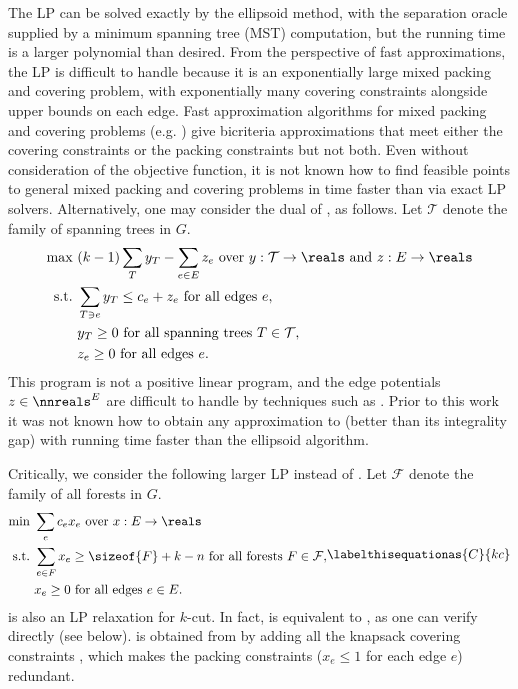 \documentclass{toc}
\newcommand{\costof}[1]{c_{#1}}
\newcommand{\capacityof}{\costof}%
\providecommand{\trees}{\mathcal{T}} %
\newcommand{\forests}{\mathcal{F}} %
\begin{document}
The LP  can be solved exactly by the ellipsoid method,
with the separation oracle supplied by a minimum spanning tree
%
(MST)   %
computation, but the running time is a larger polynomial than
desired. From the perspective of fast approximations, the LP
 is difficult to handle because it is an exponentially
large mixed packing and covering problem, with exponentially many
covering constraints alongside upper bounds on each edge. Fast
approximation algorithms for mixed packing and covering problems (e.g.
\cite{cq-18-soda,young-14}) give bicriteria approximations that
meet either the covering constraints or the packing constraints but
not both.  Even without consideration of the objective function, it is
not known how to find feasible points to general mixed packing and
covering problems in time faster than via exact LP
solvers. Alternatively, one may consider the dual of ,
as follows. Let $\trees$ denote the family of spanning trees in $G$.
\begin{align*}
  \text{max } %
  & (k-1)\sum_{T} y_T - \sum_{e \in E} z_e
    \text{ over } y: \trees \to \reals \text{ and } z: E \to \reals
  \\
  \text{s.t.\ }                 %
  & \sum_{T \ni e} y_T \leq \capacityof{e} + z_e \text{ for all edges }
    e, \\
  & y_T \geq 0 \text{ for all spanning trees } T \in \trees, %
  \\
  & z_e \geq 0 \text{ for all edges } e.
\end{align*}
This program is not a positive linear program, and the edge potentials
$z \in \nnreals^E$ are difficult to handle by techniques such as
\cite{young-14,cq-17-soda,cq-18-soda}. %
%
%
%
%
Prior to this work it was not known  %
how to obtain any approximation to  (better
than its integrality gap) with running time faster than the 
ellipsoid algorithm.

Critically, we consider the following larger LP instead of
. Let $\forests$ denote the family of all forests in
$G$.
\begin{align}
  \begin{aligned}
    \text{min } %
    & \sum_{e} \costof{e} x_e %
    \text{ over } %
    x: E \to \reals \\
    \text{s.t.\ } & \sum_{e \in F} x_e \geq \sizeof{F} + k - n \text{
      for all forests } F \in \forests,
    \\
    & %
    x_e \geq 0 \text{ for all edges } e \in E.
  \end{aligned}
      \labelthisequationas{C}{kc}
\end{align}
 is also an LP relaxation for $k$-cut. In fact,
 is equivalent to , as one can verify
directly (see  below).  is obtained
from  by adding all the knapsack covering constraints
\cite{cflp-00}, which makes the packing constraints ($x_e \leq 1$ for
each edge $e$) redundant.
\end{document}
